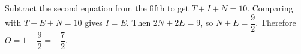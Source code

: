 Subtract the second equation from the fifth to get $ T+I+N=10 $. Comparing with $ T+E+N=10 $ gives $ I=E $. Then $ 2N+2E=9 $, so $ N+E=\dfrac{9}{2}$. Therefore $ O=1-\dfrac{9}{2}=\boxed{-\dfrac{7}{2}}$.
